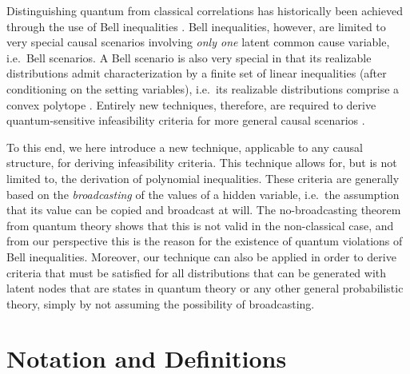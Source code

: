 Distinguishing quantum from classical correlations has historically been achieved through the use of Bell inequalities \cite{bell1966lhvm,GisinFramework2012,scarani2012device,Brunner2013Bell,BancalDIApproach}. Bell inequalities, however, are limited to very special causal scenarios involving \emph{only one} latent common cause variable, i.e.~Bell scenarios. A Bell scenario is also very special in that its realizable distributions admit characterization by a finite set of linear inequalities (after conditioning on the setting variables), i.e.~its realizable distributions comprise a convex polytope \cite{GisinFramework2012,FritzDuality}. %
Entirely new techniques, therefore, are required to derive quantum-sensitive infeasibility criteria for more general causal scenarios \cite{fritz2012bell,pusey2014gdag,BeyondBellII}. 

To this end, we here introduce a new technique, applicable to any causal structure, for deriving infeasibility criteria. This technique allows for, but is not limited to, the derivation of polynomial inequalities.
These criteria are generally based on the \emph{broadcasting} of the values of a hidden variable, i.e.~the assumption that its value can be copied and broadcast at will. The no-broadcasting theorem from quantum theory shows that this is not valid in the non-classical case, and from our perspective this is the reason for the existence of quantum violations of Bell inequalities. Moreover, our technique can also be applied in order to derive criteria that must be satisfied for all distributions that can be generated with latent nodes that are states in quantum theory or any other general probabilistic theory, simply by not assuming the possibility of broadcasting.

\section{Notation and Definitions}\label{sec:definitions}

